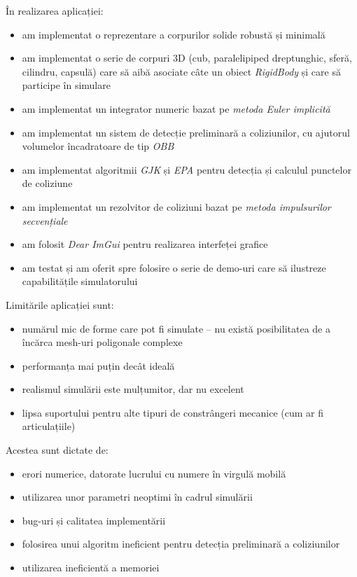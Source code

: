 \documentclass[12pt,a4paper]{report}
\begin{document}
În realizarea aplicației:
	\begin{itemize}
		\item am implementat o reprezentare a corpurilor solide robustă și minimală
		\item am implementat o serie de corpuri 3D (cub, paralelipiped dreptunghic, sferă, cilindru, capsulă) care să aibă asociate câte un obiect \textit{RigidBody} și care să participe în simulare
		\item am implementat un integrator numeric bazat pe \textit{metoda Euler implicită}
		\item am implementat un sistem de detecție preliminară a coliziunilor, cu ajutorul volumelor încadratoare de tip \textit{OBB}
		\item am implementat algoritmii \textit{GJK} și \textit{EPA} pentru detecția și calculul punctelor de coliziune
		\item am implementat un rezolvitor de coliziuni bazat pe \textit{metoda impulsurilor secvențiale}
		\item am folosit \textit{Dear ImGui} pentru realizarea interfeței grafice
		\item am testat și am oferit spre folosire o serie de demo-uri care să ilustreze capabilitățile simulatorului
	\end{itemize}

Limitările aplicației sunt:
\begin{itemize}
	\item numărul mic de forme care pot fi simulate -- nu există posibilitatea de a încărca mesh-uri poligonale complexe
	\item performanța mai puțin decât ideală
	\item realismul simulării este mulțumitor, dar nu excelent
	\item lipsa suportului pentru alte tipuri de constrângeri mecanice (cum ar fi articulațiile)
\end{itemize}
Acestea sunt dictate de:
	\begin{itemize}
		\item erori numerice, datorate lucrului cu numere în virgulă mobilă
		\item utilizarea unor parametri neoptimi în cadrul simulării
		\item bug-uri și calitatea implementării
		\item folosirea unui algoritm ineficient pentru detecția preliminară a coliziunilor
		\item utilizarea ineficientă a memoriei
	\end{itemize}
\end{document}
